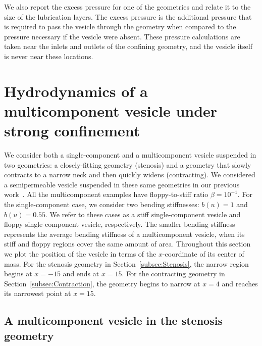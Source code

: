 \documentclass[twoside,twocolumn,9pt]{article}
\begin{document}
We also report the excess pressure for one of the geometries and relate
it to the size of the lubrication layers. The excess pressure is the
additional pressure that is required to pass the vesicle through the
geometry when compared to the pressure necessary if the vesicle were
absent. These pressure calculations are taken near the inlets and
outlets of the confining geometry, and the vesicle itself is never near
these locations. 

\section{\label{sec:results}Hydrodynamics of a multicomponent vesicle
under strong confinement}
We consider both a single-component and a multicomponent vesicle
suspended in two geometries: a closely-fitting geometry (stenosis) and a
geometry that slowly contracts to a narrow neck and then quickly widens
(contracting). We considered a semipermeable vesicle suspended in these
same geometries in our previous work~\cite{qua-gan-you2021}. All the
multicomponent examples have floppy-to-stiff ratio $\beta = 10^{-1}$.
For the single-component case, we consider two bending stiffnesses:
$b(u) = 1$ and $b(u) = 0.55$. We refer to these cases as a stiff
single-component vesicle and floppy single-component vesicle,
respectively. The smaller bending stiffness represents the average
bending stiffness of a multicomponent vesicle, when its stiff and floppy
regions cover the same amount of area. Throughout this section we plot
the position of the vesicle in terms of the $x$-coordinate of its center
of mass. For the stenosis geometry in Section~\ref{subsec:Stenosis}, the
narrow region begins at $x=-15$ and ends at $x=15$. For the contracting
geometry in Section~\ref{subsec:Contraction}, the geometry begins to
narrow at $x=4$ and reaches its narrowest point at $x=15$.


\subsection{\label{subsec:Stenosis}A multicomponent vesicle in the
stenosis geometry}
\end{document}
